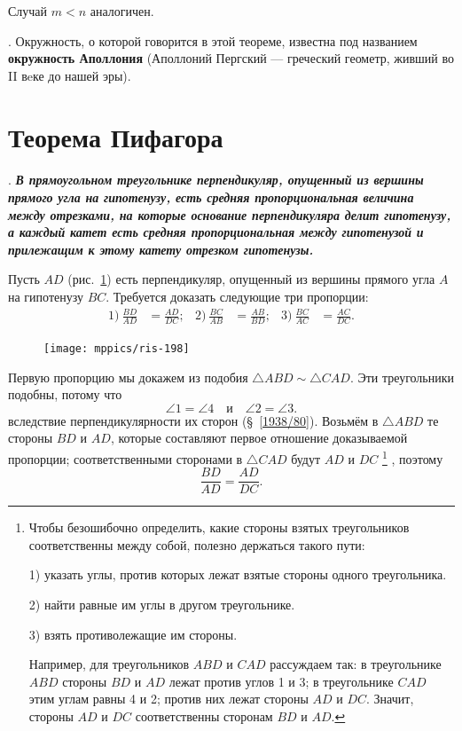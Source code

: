 \documentclass[twoside]{book}
\makeatletter
\newcommand{\rindex}[2][\imki@jobname]{%
  \index[#1]{\detokenize{#2}}%
}
\makeatother
\begin{document}
Случай $m<n$ аналогичен.

.
Окружность, о которой говорится в этой теореме, известна под названием \rindex{окружность Аполлония}\textbf{окружность Аполлония} (Аполлоний Пергский — греческий геометр, живший во II вeке до нашей эры).

\section{Теорема Пифагора}

\paragraph{}\label{1938/188}
.
\textbf{\emph{В прямоугольном треугольнике перпендикуляр, опущенный из вершины прямого угла на гипотенузу, есть средняя пропорциональная величина между отрезками, на которые основание перпендикуляра делит гипотенузу, а каждый катет есть средняя пропорциональная между гипотенузой и прилежащим к этому катету отрезком гипотенузы.}}

Пусть $AD$ (рис.~\ref{1938/ris-198}) есть перпендикуляр, опущенный из вершины прямого угла $A$ на гипотенузу $BC$.
Требуется доказать следующие три пропорции:
\begin{align*}
1)\ \frac{BD}{AD}&=\frac{AD}{DC};
&
2)\ \frac{BC}{AB}&=\frac{AB}{BD};
&
3)\ \frac{BC}{AC}&=\frac{AC}{DC}.
\end{align*}

\begin{figure}
\centering
\texttt{[image: mppics/ris-198]}
\caption{}\label{1938/ris-198}
\end{figure}

Первую пропорцию мы докажем из подобия $\triangle ABD\sim \triangle CAD$.
Эти треугольники подобны, потому что
\[\angle 1 = \angle 4\quad \text{и} \quad\angle 2 = \angle 3.\]
вследствие перпендикулярности их сторон (§~\ref{1938/80}).
Возьмём в $\triangle ABD$ те стороны $BD$ и $AD$, которые составляют первое отношение доказываемой пропорции;
соответственными сторонами в $\triangle CAD$ будут $AD$ и $DC$%
\footnote{Чтобы безошибочно определить, какие стороны взятых треугольников соответственны между собой, полезно держаться такого пути:

1) указать углы, против которых лежат взятые стороны одного треугольника.

2) найти равные им углы в другом треугольнике.

3) взять противолежащие им стороны.

Например, для треугольников $ABD$ и $CAD$ рассуждаем так:
в треугольнике $ABD$ стороны $BD$ и $AD$ лежат против углов 1 и 3;
в треугольнике $CAD$ этим углам равны 4 и 2;
против них лежат стороны $AD$ и $DC$.
Значит, стороны $AD$ и $DC$ соответственны сторонам $BD$ и $AD$.
}%
, поэтому
\[\frac{BD}{AD}=\frac{AD}{DC}.\]
\end{document}
